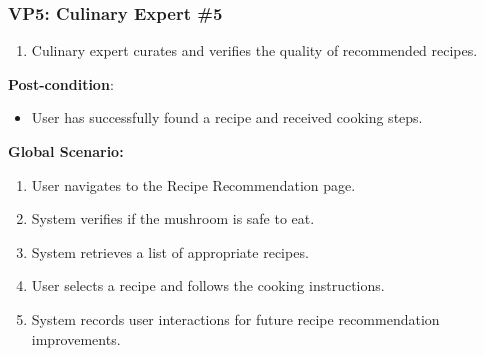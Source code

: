 \documentclass[]{article}
\begin{document}
\begin{enumerate}[{\bf BE1.}]
\begin{enumerate}[{\bf BE3.}]
\begin{enumerate}[{\bf VP1.}]
		\subsubsection*{VP5: Culinary Expert \#5}
		\begin{enumerate}
			\item Culinary expert curates and verifies the quality of recommended recipes.
		\end{enumerate}
		
		\textbf{Post-condition}:  
		\begin{itemize}
			\item User has successfully found a recipe and received cooking steps.
		\end{itemize}
		
		\textbf{Global Scenario:}
		\begin{enumerate}
			\item User navigates to the Recipe Recommendation page.
			\item System verifies if the mushroom is safe to eat.
			\item System retrieves a list of appropriate recipes.
			\item User selects a recipe and follows the cooking instructions.
			\item System records user interactions for future recipe recommendation improvements.
		\end{enumerate}
		



\end{enumerate}
\end{enumerate}
\end{enumerate}
\end{document}
